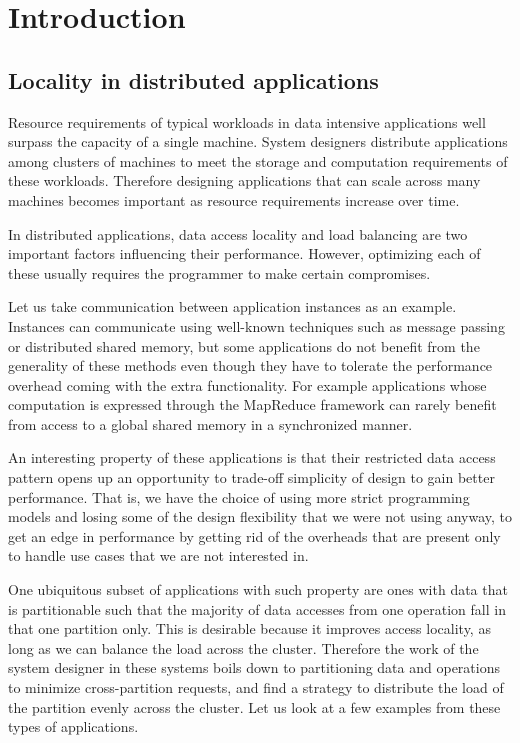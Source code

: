 \chapter{Introduction}
\label{chap:introduction}

\section{Locality in distributed applications}
Resource requirements of typical workloads in data intensive applications well surpass the
capacity of a single machine.  System designers distribute applications among clusters of
machines to
meet the storage and computation requirements of these workloads. Therefore
designing applications that can scale across many machines becomes important as
resource requirements increase over time.

In distributed applications, data access locality and load balancing
are two important factors influencing their performance. However,
optimizing each of these usually requires the programmer to make certain
compromises.

Let us take communication between application instances as an example.
Instances can communicate using well-known techniques such as message passing
or distributed shared memory, but some applications do not benefit from the
generality of these methods even though they have to tolerate the performance
overhead coming with the extra functionality. For example applications whose
computation is expressed through the MapReduce \cite{dean2008mapreduce}
framework can rarely benefit from access to a
global shared memory in a synchronized manner.

An interesting property of these applications is that their
restricted data access pattern opens up an opportunity to trade-off simplicity
of design to gain better performance. That is, we have the choice of using more
strict programming models and losing some of the design flexibility that we
were not using anyway, to get an edge in performance by getting rid of the
overheads that are present only to handle use cases that we are not interested
in.

One ubiquitous subset of applications with such property are
ones with data that is partitionable such that the majority of data
accesses from one operation fall in that one partition only.
This is desirable because it improves access locality, as
long as we can balance the load across the cluster. Therefore the work of
the system designer in these systems boils down to partitioning data and
operations to minimize cross-partition requests, and find a strategy to
distribute the load of the partition evenly across the cluster. Let us look
at a few examples from these types of applications.

